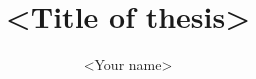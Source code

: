 \documentclass[<options>]{ugthesis}
\title{<Title of thesis>}
\author{<Your name>}
\begin{document}
\frontmatter
\maketitle

%

\tableofcontents


\mainmatter
%
%
%
%
%

%


\begin{refcontext}[sorting=nyt]
\printbibliography
\end{refcontext}
\end{document}
